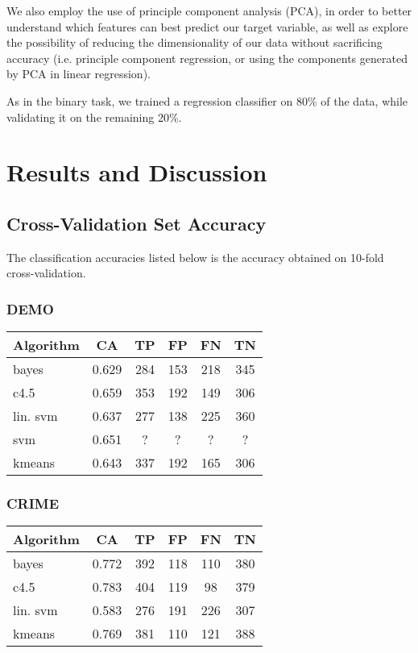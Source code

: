 \documentclass[]{article}
\begin{document}
We also employ the use of principle component analysis (PCA), in order to better understand which features can best predict our target variable, as well as explore the possibility of reducing the dimensionality of our data without sacrificing accuracy (i.e. principle component regression, or using the components generated by PCA in linear regression).

As in the binary task, we trained a regression classifier on 80\% of the data, while validating it on the remaining 20\%.

\section{Results and Discussion}

\subsection{Cross-Validation Set Accuracy}
The classification accuracies listed below is the accuracy obtained on 10-fold cross-validation.

\subsubsection{DEMO}
\begin{tabular}{|l|c|c|c|c|c|}
\hline
Algorithm & CA & TP & FP & FN & TN \\
\hline
bayes  &  0.629 & 284  &  153  &  218  &  345  \\
c4.5   &  0.659 & 353  &  192  &  149  &  306  \\
lin. svm & 0.637 & 277  &  138  &  225  &  360  \\
svm & 0.651 & ? & ? & ? & ? \\
kmeans  & 0.643 & 337  &  192  &  165  &  306  \\
\hline
\end{tabular}

\subsubsection{CRIME}
\begin{tabular}{|l|c|c|c|c|c|}
\hline
Algorithm & CA & TP & FP & FN & TN \\
\hline
bayes  &  0.772  & 392 &   118 &   110 &   380  \\
c4.5   &  0.783 & 404  &  119 &   98   &  379  \\
lin. svm & 0.583 & 276  &  191 &   226  &  307  \\
kmeans  & 0.769 & 381  &  110 &   121  &  388  \\
\hline
\end{tabular}
\end{document}
